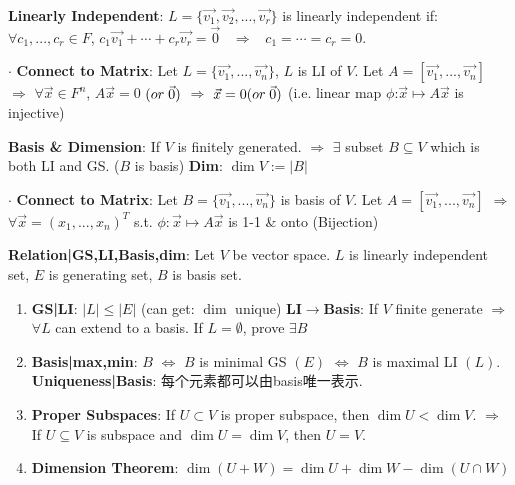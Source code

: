 \documentclass[9pt]{article}
\begin{document}
\textbf{Linearly Independent}: $L=\{\vec{v_1},\vec{v_2},...,\vec{v_r}\}$ is linearly independent if: \ $\forall c_1,...,c_r\in F$, $c_1\vec{v_1}+\cdots+c_r\vec{v_r}=\vec{0}$ \ $\Rightarrow$ \ $c_1=\cdots =c_r=0$.

$\cdot$ \textbf{Connect to Matrix}: {\footnotesize Let $L=\{\vec{v_1},...,\vec{v_n}\}$, $L$ is LI of $V$. Let $A=[\vec{v_1},...,\vec{v_n}]$ $\Rightarrow$ $\forall\vec{x}\in F^n$, $A\vec{x}=0$ ${\scriptsize (or \ \vec{0})}$ $\Rightarrow$ $\vec{x}=0 {\scriptsize (or \ \vec{0})}$ (i.e. linear map $\phi$:$\vec{x}\mapsto A\vec{x}$ is injective)}

\textbf{Basis \& Dimension}: If $V$ is finitely generated. $\Rightarrow$ $\exists$ subset $B\subseteq V$ which is both LI and GS. ($B$ is basis) \quad \textbf{Dim}: $\dim V:=|B|$

$\cdot$ \textbf{Connect to Matrix}: {\footnotesize Let $B=\{\vec{v_1},...,\vec{v_n}\}$ is basis of $V$. Let $A=[\vec{v_1},...,\vec{v_n}]$ $\Rightarrow$ $\forall\vec{x}=(x_1,...,x_n)^T$ s.t. $\phi:\vec{x}\mapsto A\vec{x}$ is 1-1 \& onto (Bijection)}

\textbf{Relation|GS,LI,Basis,dim}: {\small Let $V$ be vector space. $L$ is linearly independent set, $E$ is generating set, $B$ is basis set.}

\begin{enumerate}[itemsep=-2pt, topsep=-2pt]
    \item \textbf{GS|LI}: $|L|\leq|E|$ {\scriptsize (can get: $\dim$ unique)} \quad \textbf{LI$\to$Basis}: If $V$ finite generate $\Rightarrow$ $\forall L$ can extend to a basis. {\scriptsize If $L=\emptyset$, prove $\exists B$}
    \item \textbf{Basis|max,min}: $B$ $\Leftrightarrow$ $B$ is minimal GS $(E)$ $\Leftrightarrow$ $B$ is maximal LI $(L)$. \quad \textbf{Uniqueness|Basis}: {\small 每个元素都可以由basis唯一表示.}
    \item \textbf{Proper Subspaces}: {\small If $U\subset V$ is proper subspace, then $\dim U<\dim V$. \quad $\Rightarrow$ \quad If $U\subseteq V$ is subspace and $\dim U=\dim V$, then $U=V$.}
    \item \textbf{Dimension Theorem}: $\dim(U+W)=\dim U+\dim W-\dim(U\cap W)$
\end{enumerate}




\end{document}

